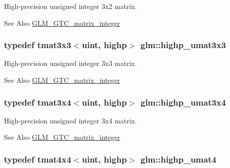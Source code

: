 High-\/precision unsigned integer 3x2 matrix. \begin{DoxySeeAlso}{See Also}
\hyperlink{group__gtc__matrix__integer}{G\-L\-M\-\_\-\-G\-T\-C\-\_\-matrix\-\_\-integer} 
\end{DoxySeeAlso}
\hypertarget{group__gtc__matrix__integer_ga770b01686af4fbbb13bbd7bd97d60fe4}{
\subsubsection[{highp\-\_\-umat3x3}]{\setlength{\rightskip}{0pt plus 5cm}typedef tmat3x3$<$uint, highp$>$ {\bf glm\-::highp\-\_\-umat3x3}}}\label{group__gtc__matrix__integer_ga770b01686af4fbbb13bbd7bd97d60fe4}
High-\/precision unsigned integer 3x3 matrix. \begin{DoxySeeAlso}{See Also}
\hyperlink{group__gtc__matrix__integer}{G\-L\-M\-\_\-\-G\-T\-C\-\_\-matrix\-\_\-integer} 
\end{DoxySeeAlso}
\hypertarget{group__gtc__matrix__integer_gaa2fb29026c9c80c7d17b5389e36d6aa7}{
\subsubsection[{highp\-\_\-umat3x4}]{\setlength{\rightskip}{0pt plus 5cm}typedef tmat3x4$<$uint, highp$>$ {\bf glm\-::highp\-\_\-umat3x4}}}\label{group__gtc__matrix__integer_gaa2fb29026c9c80c7d17b5389e36d6aa7}
High-\/precision unsigned integer 3x4 matrix. \begin{DoxySeeAlso}{See Also}
\hyperlink{group__gtc__matrix__integer}{G\-L\-M\-\_\-\-G\-T\-C\-\_\-matrix\-\_\-integer} 
\end{DoxySeeAlso}
\hypertarget{group__gtc__matrix__integer_ga7b0e78c54432c7236d8b96473b7423ec}{
\subsubsection[{highp\-\_\-umat4}]{\setlength{\rightskip}{0pt plus 5cm}typedef tmat4x4$<$uint, highp$>$ {\bf glm\-::highp\-\_\-umat4}}}\label{group__gtc__matrix__integer_ga7b0e78c54432c7236d8b96473b7423ec}
